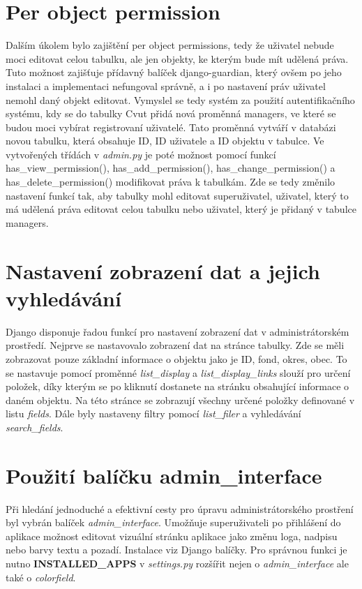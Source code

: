 \section{Per object permission}

Dalším úkolem bylo zajištění per object permissions, tedy že uživatel nebude moci editovat celou tabulku, ale jen objekty, ke kterým bude mít udělená práva. Tuto možnost zajišťuje přídavný balíček django-guardian, který ovšem po jeho instalaci a implementaci nefungoval správně, a i po nastavení práv uživatel nemohl daný objekt editovat. Vymyslel se tedy systém za použití autentifikačního systému, kdy se do tabulky Cvut přidá nová proměnná managers, ve které se budou moci vybírat registrovaní uživatelé. Tato proměnná vytváří v databázi novou tabulku, která obsahuje ID, ID uživatele a ID objektu v tabulce. Ve vytvořených třídách v \emph{admin.py} je poté možnost pomocí funkcí has\_view\_permission(), has\_add\_permission(), has\_change\_permission() a has\_delete\_permission() modifikovat práva k tabulkám. Zde se tedy změnilo nastavení funkcí tak, aby tabulky mohl editovat superuživatel, uživatel, který to má udělená práva editovat celou tabulku nebo uživatel, který je přidaný v tabulce managers. 


\section{Nastavení zobrazení dat a jejich vyhledávání}

Django disponuje řadou funkcí pro nastavení zobrazení dat v administrátorském prostředí. Nejprve se nastavovalo zobrazení dat na stránce tabulky. Zde se měli zobrazovat pouze základní informace o objektu jako je ID, fond, okres, obec. To se nastavuje pomocí proměnné \emph{list\_display} a \emph{list\_display\_links} slouží pro určení položek, díky kterým se po kliknutí dostanete na stránku obsahující informace o daném objektu. Na této stránce se zobrazují všechny určené položky definované v listu \emph{fields}. Dále byly nastaveny filtry pomocí \emph{list\_filer} a vyhledávání \emph{search\_fields}. 


\section{Použití balíčku admin\_interface}

Při hledání jednoduché a efektivní cesty pro úpravu administrátorského prostření byl vybrán balíček \emph{admin\_interface}. Umožňuje superuživateli po přihlášení do aplikace možnost editovat vizuální stránku aplikace jako změnu loga, nadpisu nebo barvy textu a pozadí. Instalace viz Django balíčky. Pro správnou funkci je nutno \textbf{INSTALLED\_APPS} v \emph{settings.py} rozšířit nejen o \emph{admin\_interface} ale také o \emph{colorfield}.



